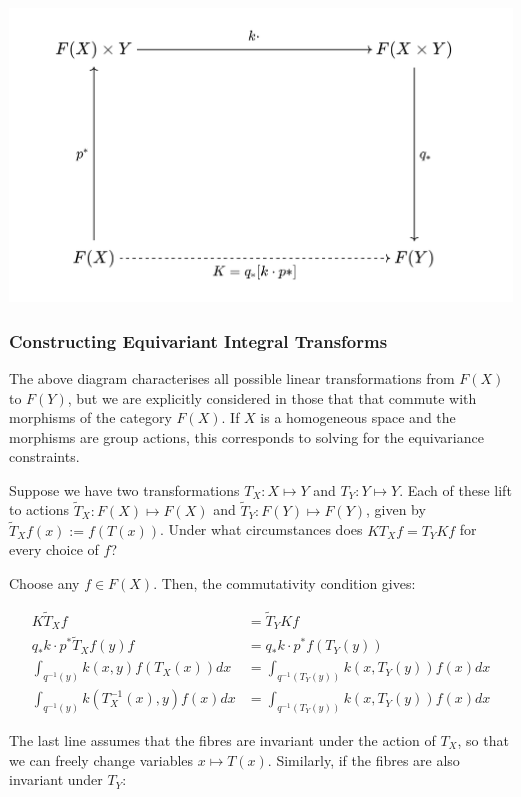 \documentclass[11pt]{article}
\begin{document}
\includegraphics[scale=0.4]{integral_transform_diagram.png}

\subsubsection*{Constructing Equivariant Integral Transforms}

The above diagram characterises all possible linear transformations from $F(X)$ to $F(Y)$, but we are explicitly considered in those that that commute with morphisms of the category $F(X)$. If $X$ is a homogeneous space and the morphisms are group actions, this corresponds to solving for the equivariance constraints.

Suppose we have two transformations $T_X: X \mapsto Y$ and $T_Y: Y \mapsto Y$. Each of these lift to actions $\tilde{T}_X: F(X) \mapsto F(X)$ and $\tilde{T}_Y: F(Y) \mapsto F(Y)$, given by $\tilde{T}_X f(x) := f(T(x))$. Under what circumstances does $K T_X f = T_Y K f$ for every choice of $f$?

Choose any $f \in F(X)$. Then, the commutativity condition gives:

\begin{align*}
  K \tilde{T}_X f &= \tilde{T}_Y K f \\
  q_* k \cdot p^*\tilde{T}_X f (y) f &= q_* k \cdot p^* f (T_Y(y)) \\
  \int_{q^{-1}(y)} k(x, y) f(T_X(x)) dx &= \int_{q^{-1}(T_Y(y))} k(x, T_Y(y)) f(x) dx \\
  \int_{q^{-1}(y)} k(T_X^{-1}(x), y) f(x) dx &= \int_{q^{-1}(T_Y(y))} k(x, T_Y(y)) f(x) dx 
\end{align*}

The last line assumes that the fibres are invariant under the action of $T_X$, so that we can freely change variables $x \mapsto T(x)$. Similarly, if the fibres are also invariant under $T_Y$:
\end{document}
